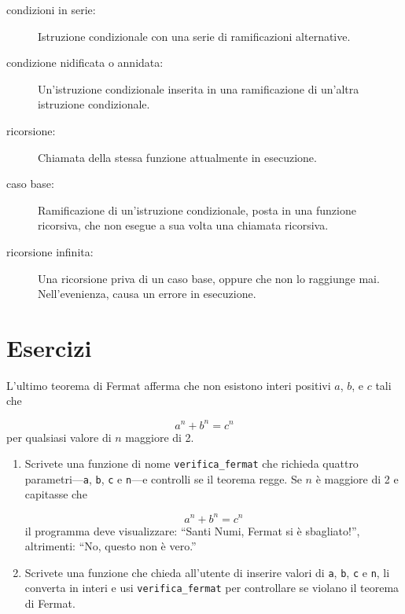 \documentclass[10pt]{book}
\begin{document}
\begin{description}
\item[condizioni in serie:]  Istruzione condizionale con una serie di ramificazioni alternative.

\item[condizione nidificata o annidata:]  Un'istruzione condizionale inserita in una ramificazione di un'altra istruzione condizionale.

\item[ricorsione:]  Chiamata della stessa funzione attualmente in esecuzione.

\item[caso base:]  Ramificazione di un'istruzione condizionale, posta in una    funzione ricorsiva, che non esegue a sua volta una chiamata ricorsiva.

\item[ricorsione infinita:]  Una ricorsione priva di un caso base, oppure che non lo raggiunge mai. Nell'evenienza, causa un errore in esecuzione.

\end{description}

\section{Esercizi}

\begin{exercise}

L'ultimo teorema di Fermat afferma che non esistono interi positivi
$a$, $b$, e $c$ tali che

\[ a^n + b^n = c^n \]
%
per qualsiasi valore di $n$ maggiore di 2.

\begin{enumerate}

\item Scrivete una funzione di nome \verb"verifica_fermat" che richieda quattro parametri---{\tt a}, {\tt b}, {\tt c} e {\tt n}---e controlli se il teorema regge. Se $n$ è maggiore di 2 e capitasse che 

\[a^n + b^n = c^n \]
%
il programma deve visualizzare: ``Santi Numi, Fermat si è sbagliato!'',
altrimenti: ``No, questo non è vero.''

\item Scrivete una funzione che chieda all'utente di inserire valori di {\tt a}, {\tt b}, {\tt c} e {\tt n}, li converta in interi e usi \verb"verifica_fermat" per controllare se violano il teorema di Fermat.

\end{enumerate}

\end{exercise}
\end{document}
